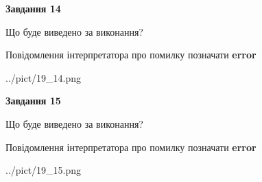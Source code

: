 \documentclass[11pt, ukrainian]{article}
\begin{document}
{\begin {large}
{\begin {center}\textbf{Завдання 14}\end {center}}\par
Що буде виведено за виконання? \par
Повідомлення інтерпретатора про помилку позначати \textbf{error}

\begin{center}
	{../pict/19_14.png}
\end{center}
\newpage

{\begin {center}\textbf{Завдання 15}\end {center}}\par
Що буде виведено за виконання? \par
Повідомлення інтерпретатора про помилку позначати \textbf{error}

\begin{center}
	{../pict/19_15.png}
\end{center}
\newpage

\end {large}}
\end{document}
